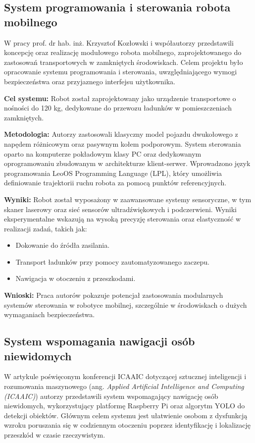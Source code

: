 \documentclass[a4paper,twoside,12pt]{book}
\begin{document}
\subsection{System programowania i sterowania robota mobilnego}

W pracy \cite{bib:mikekus2014system} prof. dr hab. inż. Krzysztof Kozłowski i współautorzy przedstawili koncepcję oraz realizację modułowego robota mobilnego, zaprojektowanego do zastosowań transportowych w zamkniętych środowiskach. Celem projektu było opracowanie systemu programowania i sterowania, uwzględniającego wymogi bezpieczeństwa oraz przyjaznego interfejsu użytkownika.

\textbf{Cel systemu:}
Robot został zaprojektowany jako urządzenie transportowe o nośności do 120 kg, dedykowane do przewozu ładunków w pomieszczeniach zamkniętych.

\textbf{Metodologia:}
Autorzy zastosowali klasyczny model pojazdu dwukołowego z napędem różnicowym oraz pasywnym kołem podporowym. System sterowania oparto na komputerze pokładowym klasy PC oraz dedykowanym oprogramowaniu zbudowanym w architekturze klient-serwer. Wprowadzono język programowania LeoOS Programming Language (LPL), który umożliwia definiowanie trajektorii ruchu robota za pomocą punktów referencyjnych.

\textbf{Wyniki:}
Robot został wyposażony w zaawansowane systemy sensoryczne, w tym skaner laserowy oraz sieć sensorów ultradźwiękowych i podczerwieni. Wyniki eksperymentalne wskazują na wysoką precyzję sterowania oraz elastyczność w realizacji zadań, takich jak:
\begin{itemize}
    \item Dokowanie do źródła zasilania.
    \item Transport ładunków przy pomocy zautomatyzowanego zaczepu.
    \item Nawigacja w otoczeniu z przeszkodami.
\end{itemize}

\textbf{Wnioski:}
Praca autorów pokazuje potencjał zastosowania modularnych systemów sterowania w robotyce mobilnej, szczególnie w środowiskach o dużych wymaganiach bezpieczeństwa.

\newpage

\subsection{System wspomagania nawigacji osób niewidomych}

W artykule \cite{bib:parvadhavardhni2023blind} poświęconym konferencji ICAAIC dotyczącej sztucznej inteligencji i rozumowania maszynowego (ang. \textit{Applied Artificial Intelligence and Computing (ICAAIC)}) autorzy przedstawili system wspomagający nawigację osób niewidomych, wykorzystujący platformę Raspberry Pi oraz algorytm YOLO do detekcji obiektów. Głównym celem systemu jest ułatwienie osobom z dysfunkcją wzroku poruszania się w codziennym otoczeniu poprzez identyfikację i lokalizację przeszkód w czasie rzeczywistym.
\end{document}
